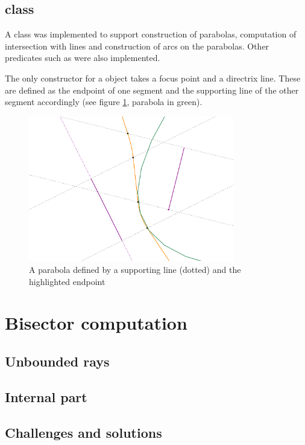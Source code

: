 \documentclass[11pt,a4paper,english]{article}
\begin{document}
	\subsection{ class}
	A  class was implemented to support construction of parabolas, computation of intersection with lines and construction of arcs on the parabolas. Other predicates such as  were also implemented.\par
	The only constructor for a  object takes a focus point and a directrix line. These are defined as the endpoint of one segment and the supporting line of the other segment accordingly (see figure \ref{fig:parabola}, parabola in green).
	\begin{figure}[h]
    \centering
    \includegraphics[width=0.8\textwidth]{parabola}
    \caption{A parabola defined by a supporting line (dotted) and the highlighted endpoint \label{fig:parabola}}
	\end{figure}
	
	

	\section{Bisector computation}
	
	\subsection{Unbounded rays}
	
	\subsection{Internal part}
	
	\subsection{Challenges and solutions}
	
\end{document}
